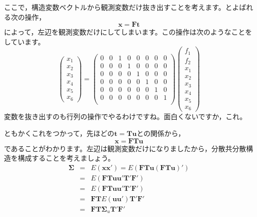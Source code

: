 \documentclass{ltjsbook}
\begin{document}
ここで，構造変数ベクトルから観測変数だけ抜き出すことを考えます。とよばれる次の操作，
\[\bm{x} = \bm{Ft}\]
によって，左辺を観測変数だけにしてしまいます。この操作は次のようなことをしています。
\[
	\begin{pmatrix} x_1\\x_2\\x_3\\x_4\\x_5\\x_6 \end{pmatrix} =
	\begin{pmatrix}
		0 & 0 & 1 & 0 & 0 & 0 & 0 & 0 \\
		0 & 0 & 0 & 1 & 0 & 0 & 0 & 0 \\
		0 & 0 & 0 & 0 & 1 & 0 & 0 & 0 \\
		0 & 0 & 0 & 0 & 0 & 1 & 0 & 0 \\
		0 & 0 & 0 & 0 & 0 & 0 & 1 & 0 \\
		0 & 0 & 0 & 0 & 0 & 0 & 0 & 1 \\
	\end{pmatrix}
	\begin{pmatrix} f_1\\f_2\\x_1\\x_2\\x_3\\x_4\\x_5\\x_6 \end{pmatrix}
\]
変数を抜き出すのも行列の操作でやるわけですね。面白くないですか，これ。

ともかくこれをつかって，先ほどの$\bm{t}=\bm{Tu}$との関係から，
\[ \bm{x} = \bm{FTu} \]
であることがわかります。左辺は観測変数だけになりましたから，分散共分散構造を構成することを考えましょう。
\[
	\begin{array}{lll}
		\bm{\Sigma} & = & E(\bm{xx}') = E(\bm{FTu}(\bm{FTu})\prime) \\
		            & = & E(\bm{FTu}\bm{u}'\bm{T}'\bm{F}')          \\
		            & = & E(\bm{FTuu'T'F'})                         \\
		            & = & \bm{FT}E(\bm{uu}')\bm{T}'\bm{F}'          \\
		            & = & \bm{FT}\bm{\Sigma}_u \bm{T}'\bm{F}'
	\end{array}
\]
\end{document}
